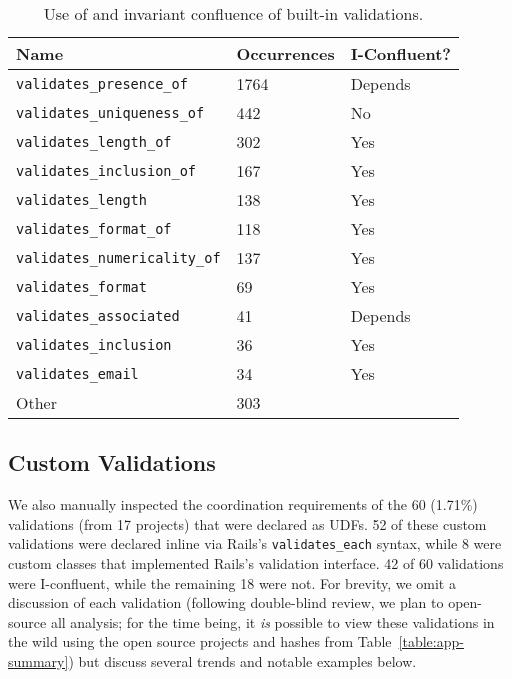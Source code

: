 \begin{table}
\begin{center}
\small
\begin{tabular}{|l l l |}
\hline
Name & Occurrences & I-Confluent?\\\hline
\texttt{validates\_presence\_of} & 1764 & Depends\\
\texttt{validates\_uniqueness\_of} & 442 & No \\
\texttt{validates\_length\_of} & 302 & Yes \\
\texttt{validates\_inclusion\_of} & 167 & Yes\\
\texttt{validates\_length} & 138 & Yes \\
\texttt{validates\_format\_of} & 118 & Yes\\
\texttt{validates\_numericality\_of} & 137 & Yes \\
\texttt{validates\_format} & 69 & Yes \\
\texttt{validates\_associated} & 41 & Depends\\
\texttt{validates\_inclusion} & 36 & Yes \\
\texttt{validates\_email} & 34 & Yes \\
Other & 303 & \\\hline
\end{tabular}
\end{center}\vspace{-1em}
\caption{Use of and invariant confluence of built-in validations.}
\label{table:builtins}
\end{table}

\subsection{Custom Validations}

We also manually inspected the coordination requirements of the 60
(1.71\%) validations (from 17 projects) that were declared as UDFs. 52
of these custom validations were declared inline via Rails's
\texttt{validates\_each} syntax, while 8 were custom classes that
implemented Rails's validation interface. 42 of 60 validations were
I-confluent, while the remaining 18 were not. For brevity, we omit a
discussion of each validation (following double-blind review, we plan
to open-source all analysis; for the time being, it \textit{is}
possible to view these validations in the wild using the open source
projects and hashes from Table~\ref{table:app-summary}) but discuss
several trends and notable examples below.

